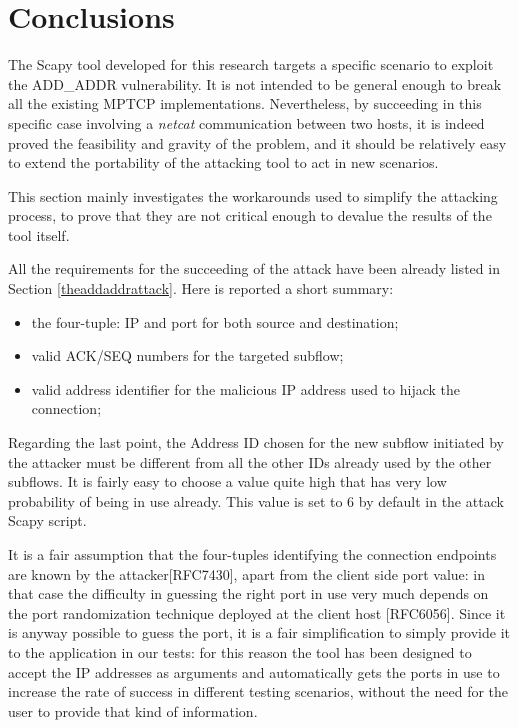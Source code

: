 \section{Conclusions} 
\label{limitationsandfuturework}
The Scapy tool developed for this research targets a specific scenario to exploit the ADD\_ADDR vulnerability. It is not intended to be general enough to break all the existing MPTCP implementations. Nevertheless, by succeeding in this specific case involving a \textit{netcat} communication between two hosts, it is indeed proved the feasibility and gravity of the problem, and it should be relatively easy to extend the portability of the attacking tool to act in new scenarios. 

This section mainly investigates the workarounds used to simplify the attacking process, to prove that they are not critical enough to devalue the results of the tool itself.

\vspace{5mm} %
All the requirements for the succeeding of the attack have been already listed in Section \ref{theaddaddrattack}. Here is reported a short summary:

\begin{itemize}  
\item the four-tuple: IP and port for both source and destination;
\item valid ACK/SEQ numbers for the targeted subflow;
\item valid address identifier for the malicious IP address used to hijack the connection;
\end{itemize}

Regarding the last point, the Address ID chosen for the new subflow initiated by the attacker must be different from all the other IDs already used by the other subflows. It is fairly easy to choose a value quite high that has very low probability of being in use already. This value is set to 6 by default in the attack Scapy script.

It is a fair assumption that the four-tuples identifying the connection endpoints are known by the attacker[RFC7430], apart from the client side port value: in that case the difficulty in guessing the right port in use very much depends on the port randomization technique deployed at the client host [RFC6056]. Since it is anyway possible to guess the port, it is a fair simplification to simply provide it to the application in our tests: for this reason the tool has been designed to accept the IP addresses as arguments and automatically gets the ports in use to increase the rate of success in different testing scenarios, without the need for the user to provide that kind of information.

